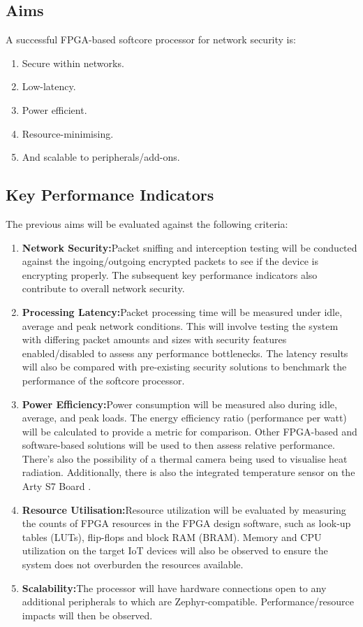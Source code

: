 \subsection{Aims}
A successful FPGA-based softcore processor for network security is:
\begin{enumerate}
    \item Secure within networks.
    \item Low-latency.
    \item Power efficient.
    \item Resource-minimising.
    \item And scalable to peripherals/add-ons.
\end{enumerate}

\subsection{Key Performance Indicators}
The previous aims will be evaluated against the following criteria:
\begin{enumerate}
    \item\textbf{Network Security:}\newline Packet sniffing and interception testing will be conducted against the ingoing/outgoing encrypted packets to see if the device is encrypting properly. The subsequent key performance indicators also contribute to overall network security.
    \item\textbf{Processing Latency:}\newline Packet processing time will be measured under idle, average and peak network conditions. This will involve testing the system with differing packet amounts and sizes with security features enabled/disabled to assess any performance bottlenecks. The latency results will also be compared with pre-existing security solutions to benchmark the performance of the softcore processor.
    \item\textbf{Power Efficiency:}\newline Power consumption will be measured also during idle, average, and peak loads. The energy efficiency ratio (performance per watt) will be calculated to provide a metric for comparison. Other FPGA-based and software-based solutions will be used to then assess relative performance. There's also the possibility of a thermal camera being used to visualise heat radiation. Additionally, there is also the integrated temperature sensor on the Arty S7 Board \cite{ArtyS7RefManual}.
    \item\textbf{Resource Utilisation:}\newline Resource utilization will be evaluated by measuring the counts of FPGA resources in the FPGA design software, such as look-up tables (LUTs), flip-flops and block RAM (BRAM). Memory and CPU utilization on the target IoT devices will also be observed to ensure the system does not overburden the resources available.
    \item\textbf{Scalability:}\newline The processor will have hardware connections open to any additional peripherals to which are Zephyr-compatible. Performance/resource impacts will then be observed.
\end{enumerate}

